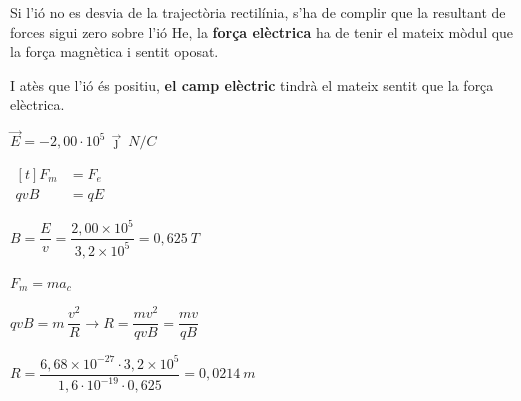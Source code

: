 \begin{solapartat}
\begin{minipage}[t]{0.42\linewidth}
 Si l'ió no es desvia de la trajectòria rectilínia, s'ha de complir que la resultant de forces sigui zero sobre l'ió He, la \textbf{força elèctrica} ha de tenir el mateix mòdul que la força magnètica i sentit oposat.
\end{minipage}\hfill
\begin{minipage}[t]{0.52\linewidth}
\vspace{0pt}
\end{minipage}

\medskip
{} I atès que l'ió és positiu, \textbf{el camp elèctric} tindrà el mateix sentit que la força elèctrica.

 $\vec{E} = -2,00\cdot 10^{5}\,\vec{\jmath}\ N/C$

 $\begin{aligned}[t] F_m &= F_e\\ qvB &= qE \end{aligned}$

 $B = \dfrac{E}{v} = \dfrac{2,00\times 10^{5}}{3,2\times 10^{5}} = 0,625\ T$
\end{solapartat}

\begin{solapartat}
 $F_m = ma_c$

 $qvB = m\,\dfrac{v^2}{R} \rightarrow R = \dfrac{mv^2}{qvB} = \dfrac{mv}{qB}$

 $R = \dfrac{6,68\times 10^{-27}\cdot 3,2\times 10^{5}}{1,6\cdot 10^{-19}\cdot 0,625} = 0,0214\ m$
\end{solapartat}
